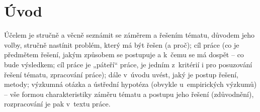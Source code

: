 \chapter*{Úvod}
Účelem je stručně a věcně seznámit se záměrem a řešením tématu, důvodem jeho volby, stručně nastínit problém, který má být řešen (a proč); cíl práce (co je předmětem řešení, jakým způsobem se postupuje a k~čemu se má dospět -- co bude výsledkem; cíl práce je „páteří“ práce, je jedním z~kritérií i pro posuzování řešení tématu, zpracování práce); dále v~úvodu uvést, jaký je postup řešení, metody; výzkumná otázka a ústřední hypotéza (obvykle u~empirických výzkumů) -- vše formou charakteristiky záměru tématu a postupu jeho řešení (zdůvodnění), rozpracování je pak v~textu práce.

\newpage
